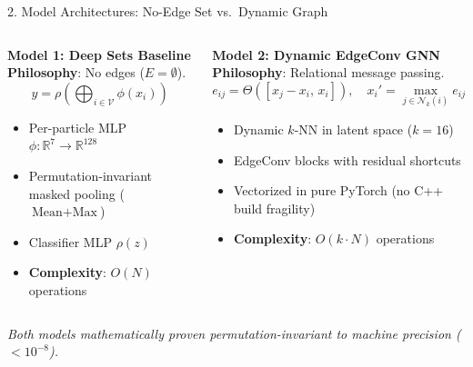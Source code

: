 \documentclass[aspectratio=169,11pt]{beamer}
\begin{document}
\begin{frame}{2. Model Architectures: No-Edge Set vs.\ Dynamic Graph}
  \begin{columns}[T]
      \begin{block}{\textbf{Model 1: Deep Sets Baseline}}
        \small
        \textbf{Philosophy}: No edges ($E = \emptyset$).
        $$y = \rho \left( \bigoplus_{i \in \mathcal{V}} \phi(x_i) \right)$$
        \begin{itemize}\footnotesize
          \item Per-particle MLP $\phi: \mathbb{R}^7 \to \mathbb{R}^{128}$
          \item Permutation-invariant masked pooling ($\text{Mean} + \text{Max}$)
          \item Classifier MLP $\rho(z)$
          \item \textbf{Complexity}: $O(N)$ operations
        \end{itemize}
      \end{block}

      \begin{block}{\textbf{Model 2: Dynamic EdgeConv GNN}}
        \small
        \textbf{Philosophy}: Relational message passing.
        $$e_{ij} = \Theta([x_j - x_i, \, x_i]), \quad x_i' = \max_{j \in \mathcal{N}_k(i)} e_{ij}$$
        \begin{itemize}\footnotesize
          \item Dynamic $k$-NN in latent space ($k=16$)
          \item EdgeConv blocks with residual shortcuts
          \item Vectorized in pure PyTorch (no C++ build fragility)
          \item \textbf{Complexity}: $O(k \cdot N)$ operations
        \end{itemize}
      \end{block}
  \end{columns}
  \vspace{6pt}
  \centering \footnotesize \emph{Both models mathematically proven permutation-invariant to machine precision ($< 10^{-8}$).}
\end{frame}
\end{document}
